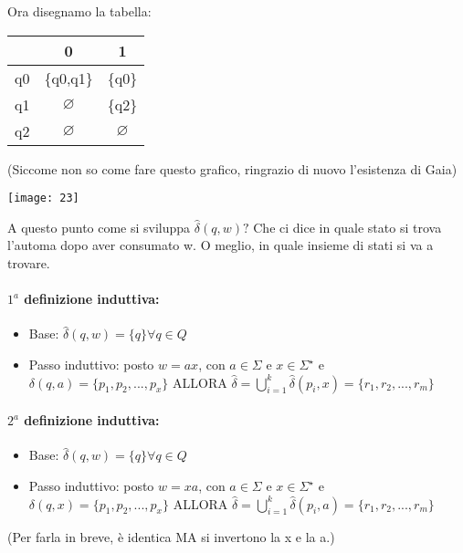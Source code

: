 \documentclass[12pt, a4paper, openany, oneside]{book}
\begin{document}
Ora disegnamo la tabella:
\begin{center}
\begin{tabular}{ |c|c|c| } 
\hline
& 0 & 1 \\ \hline
q0 & \{q0,q1\} & \{q0\} \\ 
\hline
q1 & $\varnothing$ & \{q2\} \\
\hline
q2 & $\varnothing$ & $\varnothing$ \\ 
\hline
\end{tabular}
(Siccome non so come fare questo grafico, ringrazio di nuovo l'esistenza di Gaia)

\texttt{[image: 23]}
\end{center}
A questo punto come si sviluppa $\widehat{\delta}(q,w)?$ Che ci dice in quale 
stato si trova l'automa dopo aver consumato w. O meglio, in quale insieme di stati
si va a trovare.
\paragraph{$1^{a}$ definizione induttiva: }
\begin{center}
	\begin{itemize}
		\item Base: $\widehat{\delta}(q,w) = \{q\} \forall q \in Q$
		\item Passo induttivo: posto $w = ax$, con $a \in \Sigma$ e $x \in 
		\Sigma^{\star}$ e $\delta(q,a) = \{p_{1}, p_{2}, ..., p_{x}\}$ ALLORA
		$\widehat{\delta} = \bigcup \limits_{i=1}^{k} \widehat{\delta}(p_{i},x) =
		\{r_{1}, r_{2}, ..., r_{m}\}$
	\end{itemize}
\end{center}

\paragraph{$2^{a}$ definizione induttiva: }
\begin{center}
	\begin{itemize}
		\item Base: $\widehat{\delta}(q,w) = \{q\} \forall q \in Q$
		\item Passo induttivo: posto $w = xa$, con $a \in \Sigma$ e $x \in 
		\Sigma^{\star}$ e $\delta(q,x) = \{p_{1}, p_{2}, ..., p_{x}\}$ ALLORA
		$\widehat{\delta} = \bigcup \limits_{i=1}^{k} \widehat{\delta}(p_{i},a) =
		\{r_{1}, r_{2}, ..., r_{m}\}$
	\end{itemize}
\end{center}
(Per farla in breve, è identica MA si invertono la x e la a.)
\end{document}
